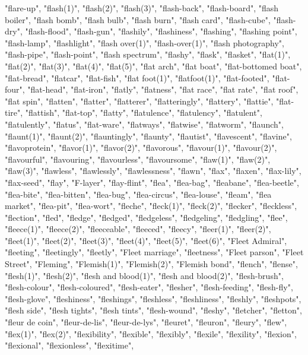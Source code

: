 "flare-up",
"flash(1)",
"flash(2)",
"flash(3)",
"flash-back",
"flash-board",
"flash boiler",
"flash bomb",
"flash bulb",
"flash burn",
"flash card",
"flash-cube",
"flash-dry",
"flash-flood",
"flash-gun",
"flashily",
"flashiness",
"flashing",
"flashing point",
"flash-lamp",
"flashlight",
"flash over(1)",
"flash-over(1)",
"flash photography",
"flash-pipe",
"flash-point",
"flash spectrum",
"flashy",
"flask",
"flasket",
"flat(1)",
"flat(2)",
"flat(3)",
"flat(4)",
"flat(5)",
"flat arch",
"flat boat",
"flat-bottomed boat",
"flat-bread",
"flatcar",
"flat-fish",
"flat foot(1)",
"flatfoot(1)",
"flat-footed",
"flat-four",
"flat-head",
"flat-iron",
"flatly",
"flatness",
"flat race",
"flat rate",
"flat roof",
"flat spin",
"flatten",
"flatter",
"flatterer",
"flatteringly",
"flattery",
"flattie",
"flat-tire",
"flattish",
"flat-top",
"flatty",
"flatulence",
"flatulency",
"flatulent",
"flatulently",
"flatus",
"flat-ware",
"flatways",
"flatwise",
"flatworm",
"flaunch",
"flaunt(1)",
"flaunt(2)",
"flauntingly",
"flaunty",
"flautist",
"flavescent",
"flavine",
"flavoprotein",
"flavor(1)",
"flavor(2)",
"flavorous",
"flavour(1)",
"flavour(2)",
"flavourful",
"flavouring",
"flavourless",
"flavoursome",
"flaw(1)",
"flaw(2)",
"flaw(3)",
"flawless",
"flawlessly",
"flawlessness",
"flawn",
"flax",
"flaxen",
"flax-lily",
"flax-seed",
"flay",
"F-layer",
"flay-flint",
"flea",
"flea-bag",
"fleabane",
"flea-beetle",
"flea-bite",
"flea-bitten",
"flea-bug",
"flea-circus",
"flea-louse",
"fleam",
"flea market",
"flea-pit",
"flea-wort",
"fleche",
"fleck(1)",
"fleck(2)",
"flecker",
"fleckless",
"flection",
"fled",
"fledge",
"fledged",
"fledgeless",
"fledgeling",
"fledgling",
"flee",
"fleece(1)",
"fleece(2)",
"fleeceable",
"fleeced",
"fleecy",
"fleer(1)",
"fleer(2)",
"fleet(1)",
"fleet(2)",
"fleet(3)",
"fleet(4)",
"fleet(5)",
"fleet(6)",
"Fleet Admiral",
"fleeting",
"fleetingly",
"fleetly",
"Fleet marriage",
"fleetness",
"Fleet parson",
"Fleet Street",
"Fleming",
"Flemish(1)",
"Flemish(2)",
"Flemish bond",
"flench",
"flense",
"flesh(1)",
"flesh(2)",
"flesh and blood(1)",
"flesh and blood(2)",
"flesh-brush",
"flesh-colour",
"flesh-coloured",
"flesh-eater",
"flesher",
"flesh-feeding",
"flesh-fly",
"flesh-glove",
"fleshiness",
"fleshings",
"fleshless",
"fleshliness",
"fleshly",
"fleshpots",
"flesh side",
"flesh tights",
"flesh tints",
"flesh-wound",
"fleshy",
"fletcher",
"fletton",
"fleur de coin",
"fleur-de-lis",
"fleur-de-lys",
"fleuret",
"fleuron",
"fleury",
"flew",
"flex(1)",
"flex(2)",
"flexibility",
"flexible",
"flexibly",
"flexile",
"flexility",
"flexion",
"flexional",
"flexionless",
"flexitime",
